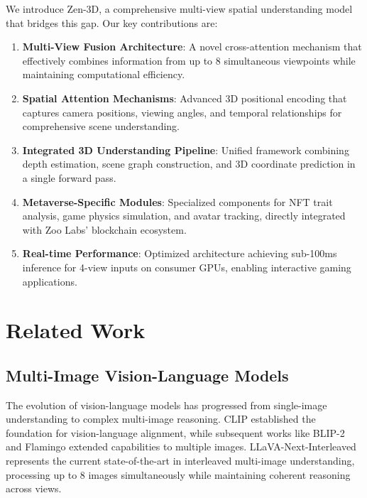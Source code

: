 \documentclass[11pt,a4paper]{article}
\begin{document}
We introduce Zen-3D, a comprehensive multi-view spatial understanding model that bridges this gap. Our key contributions are:

\begin{enumerate}
    \item \textbf{Multi-View Fusion Architecture}: A novel cross-attention mechanism that effectively combines information from up to 8 simultaneous viewpoints while maintaining computational efficiency.

    \item \textbf{Spatial Attention Mechanisms}: Advanced 3D positional encoding that captures camera positions, viewing angles, and temporal relationships for comprehensive scene understanding.

    \item \textbf{Integrated 3D Understanding Pipeline}: Unified framework combining depth estimation, scene graph construction, and 3D coordinate prediction in a single forward pass.

    \item \textbf{Metaverse-Specific Modules}: Specialized components for NFT trait analysis, game physics simulation, and avatar tracking, directly integrated with Zoo Labs' blockchain ecosystem.

    \item \textbf{Real-time Performance}: Optimized architecture achieving sub-100ms inference for 4-view inputs on consumer GPUs, enabling interactive gaming applications.
\end{enumerate}

\section{Related Work}

\subsection{Multi-Image Vision-Language Models}

The evolution of vision-language models has progressed from single-image understanding to complex multi-image reasoning. CLIP \cite{clip} established the foundation for vision-language alignment, while subsequent works like BLIP-2 \cite{blip2} and Flamingo \cite{flamingo} extended capabilities to multiple images. LLaVA-Next-Interleaved represents the current state-of-the-art in interleaved multi-image understanding, processing up to 8 images simultaneously while maintaining coherent reasoning across views.
\end{document}
